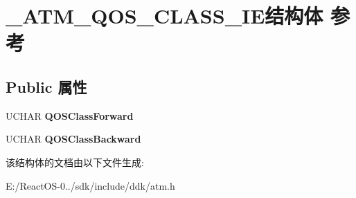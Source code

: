 \hypertarget{struct___a_t_m___q_o_s___c_l_a_s_s___i_e}{}\section{\+\_\+\+A\+T\+M\+\_\+\+Q\+O\+S\+\_\+\+C\+L\+A\+S\+S\+\_\+\+I\+E结构体 参考}
\label{struct___a_t_m___q_o_s___c_l_a_s_s___i_e}
\subsection*{Public 属性}
\begin{DoxyCompactItemize}
\item 
\mbox{\label{struct___a_t_m___q_o_s___c_l_a_s_s___i_e_a28b8f9d824a7d10fde91ae3fa59db3f9}} 
U\+C\+H\+AR {\bfseries Q\+O\+S\+Class\+Forward}
\item 
\mbox{\label{struct___a_t_m___q_o_s___c_l_a_s_s___i_e_aea2d2963977f1a8c6d5637730d7fd5f6}} 
U\+C\+H\+AR {\bfseries Q\+O\+S\+Class\+Backward}
\end{DoxyCompactItemize}


该结构体的文档由以下文件生成\+:\begin{DoxyCompactItemize}
\item 
E\+:/\+React\+O\+S-\/0../sdk/include/ddk/atm.\+h\end{DoxyCompactItemize}
